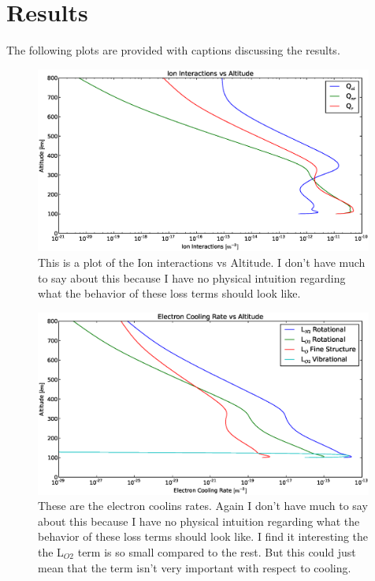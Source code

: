 \documentclass[10pt]{article}
\begin{document}
\section{Results}
The following plots are provided with captions discussing the results.
\begin{figure}[H]
	\centering
		\includegraphics[width=0.99\textwidth]{./figures/B/Ion_Interactions_vs_Altitude.eps}
	\caption{This is a plot of the Ion interactions vs Altitude. I don't have much to say about this because I have no physical intuition regarding what the behavior of these loss terms should look like.}
	\label{fig:n1}
\end{figure}
\begin{figure}[H]
	\centering
		\includegraphics[width=0.99\textwidth]{./figures/B/Electron_Cooling_Rates_vs_Altitude.eps}
	\caption{These are the electron coolins rates. Again I don't have much to say about this because I have no physical intuition regarding what the behavior of these loss terms should look like. I find it interesting the the L$_{O2}$ term is so small compared to the rest. But this could just mean that the term isn't very important with respect to cooling.}
	\label{fig:n2}
\end{figure}
\end{document}
